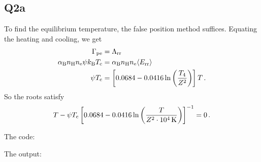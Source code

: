 \subsection{Q2a}

To find the equilibrium temperature, the false position method suffices.
Equating the heating and cooling, we get
\begin{align}
    \Gamma_{\rm pe} &= \Lambda_{\rm rr} \\
    \alpha_{\rm B} n_{\rm H} n_{\rm e} \psi k_{\rm B} T_{\rm c} &= \alpha_{\rm B} n_{\rm H} n_{\rm e} \langle E_{\rm rr} \rangle \\
    \psi T_{\rm c} &= \left[0.0684 - 0.0416 \ln\left( \frac{T_{4}}{Z^2} \right) \right]T \, .
\end{align}
So the roots satisfy
\begin{equation}
    T - \psi T_{\rm c} \left[0.0684 - 0.0416 \ln\left( \frac{T}{Z^2 \cdot 10^{4} \rm \, K} \right) \right]^{-1} = 0 \, .
\end{equation}

\noindent The code:



\noindent The output:


